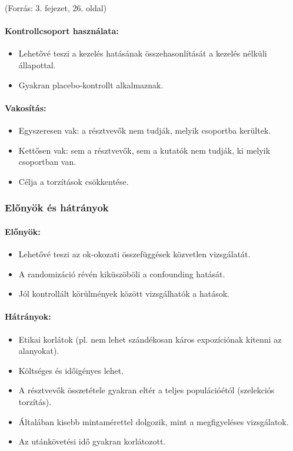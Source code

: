 \documentclass[a4paper,12pt]{article}
\begin{document}
    (Forrás: 3. fejezet, 26. oldal)

    \paragraph{Kontrollcsoport használata:}
    \begin{itemize}
        \item Lehetővé teszi a kezelés hatásának összehasonlítását a kezelés nélküli állapottal.
        \item Gyakran placebo-kontrollt alkalmaznak.
    \end{itemize}

    \paragraph{Vakosítás:}
    \begin{itemize}
        \item Egyszeresen vak: a résztvevők nem tudják, melyik csoportba kerültek.
        \item Kettősen vak: sem a résztvevők, sem a kutatók nem tudják, ki melyik csoportban van.
        \item Célja a torzítások csökkentése.
    \end{itemize}

    \subsubsection{Előnyök és hátrányok}

    \paragraph{Előnyök:}
    \begin{itemize}
        \item Lehetővé teszi az ok-okozati összefüggések közvetlen vizsgálatát.
        \item A randomizáció révén kiküszöböli a confounding hatását.
        \item Jól kontrollált körülmények között vizsgálhatók a hatások.
    \end{itemize}

    \paragraph{Hátrányok:}
    \begin{itemize}
        \item Etikai korlátok (pl. nem lehet szándékosan káros expozíciónak kitenni az alanyokat).
        \item Költséges és időigényes lehet.
        \item A résztvevők összetétele gyakran eltér a teljes populációétól (szelekciós torzítás).
        \item Általában kisebb mintamérettel dolgozik, mint a megfigyeléses vizsgálatok.
        \item Az utánkövetési idő gyakran korlátozott.
    \end{itemize}
\end{document}
